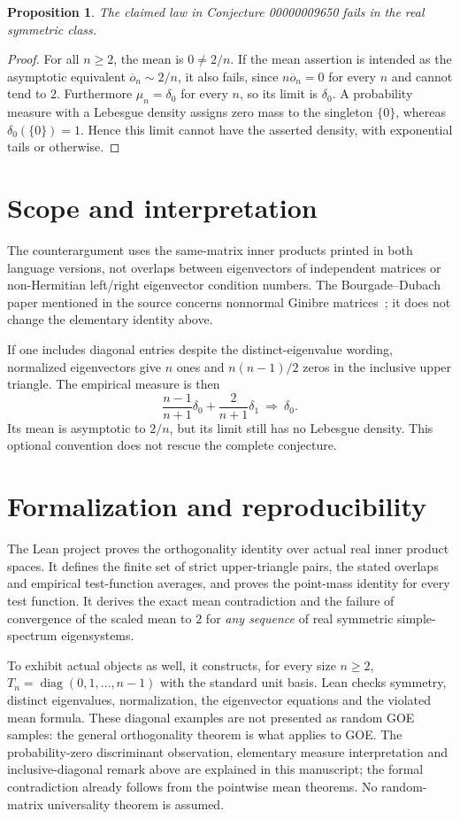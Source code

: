 \documentclass[11pt]{article}
\newtheorem{proposition}{Proposition}
\begin{document}
\begin{proposition}
The claimed law in Conjecture 00000009650 fails in the real symmetric class.
\end{proposition}
\begin{proof}
For all $n\geq2$, the mean is $0\ne2/n$. If the mean assertion is intended
as the asymptotic equivalent $\overline o_n\sim2/n$, it also fails, since
$n\overline o_n=0$ for every $n$ and cannot tend to $2$.
Furthermore $\mu_n=\delta_0$ for every $n$, so its limit is $\delta_0$.
A probability measure with a Lebesgue density assigns zero mass to the
singleton $\{0\}$, whereas $\delta_0(\{0\})=1$. Hence this limit cannot
have the asserted density, with exponential tails or otherwise.
\end{proof}

\section*{Scope and interpretation}
The counterargument uses the same-matrix inner products printed in both
language versions, not overlaps between eigenvectors of independent
matrices or non-Hermitian left/right eigenvector condition numbers.
The Bourgade--Dubach paper mentioned in the source concerns nonnormal
Ginibre matrices~\cite{BD}; it does not change the elementary identity above.

If one includes diagonal entries despite the distinct-eigenvalue wording,
normalized eigenvectors give $n$ ones and $n(n-1)/2$ zeros in the inclusive
upper triangle. The empirical measure is then
\[
        \frac{n-1}{n+1}\delta_0+\frac{2}{n+1}\delta_1
        \ \Longrightarrow\ \delta_0.
\]
Its mean is asymptotic to $2/n$, but its limit still has no Lebesgue density.
This optional convention does not rescue the complete conjecture.

\section*{Formalization and reproducibility}
The Lean project proves the orthogonality identity over actual real inner
product spaces. It defines the finite set of strict upper-triangle pairs,
the stated overlaps and empirical test-function averages, and proves the
point-mass identity for every test function. It derives the exact mean
contradiction and the failure of convergence of the scaled mean to $2$ for
\emph{any sequence} of real symmetric simple-spectrum eigensystems.

To exhibit actual objects as well, it constructs, for every size $n\geq2$,
$T_n=\operatorname{diag}(0,1,\ldots,n-1)$ with the standard unit basis.
Lean checks symmetry, distinct eigenvalues, normalization, the eigenvector
equations and the violated mean formula. These diagonal examples are not
presented as random GOE samples: the general orthogonality theorem is what
applies to GOE. The probability-zero discriminant observation, elementary
measure interpretation and inclusive-diagonal remark above are explained
in this manuscript; the formal contradiction already follows from the
pointwise mean theorems. No random-matrix universality theorem is assumed.
\end{document}
